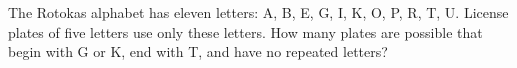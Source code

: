 The Rotokas alphabet has eleven letters: A, B, E, G, I, K, O, P, R, T, U. License plates of five letters use only these letters. How many plates are possible that begin with G or K, end with T, and have no repeated letters?
